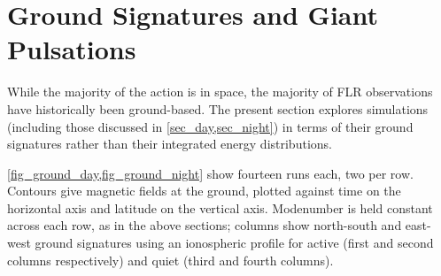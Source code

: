 



\section{Ground Signatures and Giant Pulsations}
  \label{sec_ground}

While the majority of the action is in space, the majority of FLR observations
have historically been ground-based. The present section explores simulations
(including those discussed in \cref{sec_day,sec_night}) in terms of their
ground signatures rather than their integrated energy distributions. 

\cref{fig_ground_day,fig_ground_night} show fourteen runs each, two per row.
Contours give magnetic fields at the ground, plotted against time on the
horizontal axis and latitude on the vertical axis. Modenumber is held constant
across each row, as in the above sections; columns show north-south and
east-west ground signatures using an ionospheric profile for active (first and
second columns respectively) and quiet (third and fourth columns). 

